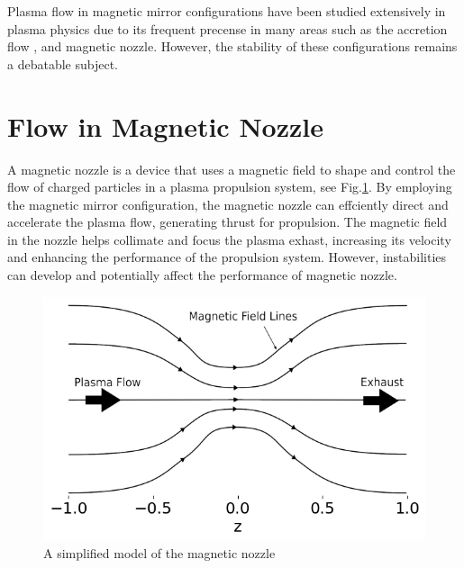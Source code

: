 Plasma flow in magnetic mirror configurations have been studied extensively in plasma physics due to its frequent precense in many areas such as the accretion flow \cite{jockers_stability_1968,aikawa_stability_1979}, and magnetic nozzle\cite{smolyakov_quasineutral_2021}. However, the stability of these configurations remains a debatable subject.

\section{Flow in Magnetic Nozzle}
A magnetic nozzle is a device that uses a magnetic field to shape and control the flow of charged particles in a plasma propulsion system, see Fig.\ref{fig:magnetic-nozzle}. By employing the magnetic mirror configuration, the magnetic nozzle can effciently direct and accelerate the plasma flow, generating thrust for propulsion. The magnetic field in the nozzle helps collimate and focus the plasma exhast, increasing its velocity and enhancing the performance of the propulsion system. However, instabilities can develop and potentially affect the performance of magnetic nozzle. \cite{kaganovich_2020_physics}

\begin{figure}[htbp]
  \centering
  \includegraphics[width=0.7\linewidth]{figures/magnetic-nozzle}
  \caption{A simplified model of the magnetic nozzle}
  \label{fig:magnetic-nozzle}
\end{figure}

